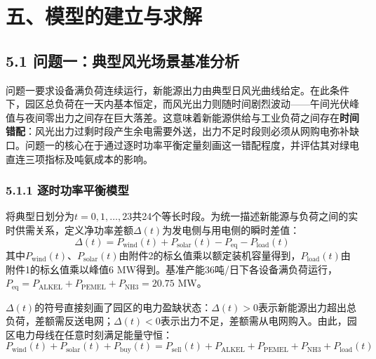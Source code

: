 \documentclass[zihao=-4,a4paper]{ctexart} %
\begin{document}
	\section*{五、模型的建立与求解}
	
	
	\subsection*{5.1 问题一：典型风光场景基准分析}
	
	问题一要求设备满负荷连续运行，新能源出力由典型日风光曲线给定。在此条件下，园区总负荷在一天内基本恒定，而风光出力则随时间剧烈波动——午间光伏峰值与夜间零出力之间存在巨大落差。这意味着新能源供给与工业负荷之间存在\textbf{时间错配}：风光出力过剩时段产生余电需要外送，出力不足时段则必须从网购电弥补缺口。问题一的核心在于通过逐时功率平衡定量刻画这一错配程度，并评估其对绿电直连三项指标及吨氨成本的影响。
	
	\subsubsection*{5.1.1 逐时功率平衡模型}
	将典型日划分为$t=0,1,\dots,23$共24个等长时段。为统一描述新能源与负荷之间的实时供需关系，定义净功率差额$\Delta(t)$为发电侧与用电侧的瞬时差值：
	\begin{equation}
		\Delta(t) = P_{\text{wind}}(t) + P_{\text{solar}}(t) - P_{\text{eq}} - P_{\text{load}}(t)
		\label{eq:delta}
	\end{equation}
	其中$P_{\text{wind}}(t)$、$P_{\text{solar}}(t)$由附件2的标幺值乘以额定装机容量得到，$P_{\text{load}}(t)$由附件1的标幺值乘以峰值6 MW得到。基准产能36吨/日下各设备满负荷运行，$P_{\text{eq}}=P_{\text{ALKEL}}+P_{\text{PEMEL}}+P_{\text{NH3}}=20.75$ MW。
	
	$\Delta(t)$的符号直接刻画了园区的电力盈缺状态：$\Delta(t)>0$表示新能源出力超出总负荷，差额需反送电网；$\Delta(t)<0$表示出力不足，差额需从电网购入。由此，园区电力母线在任意时刻满足能量守恒：
	\begin{equation}
		P_{\text{wind}}(t) + P_{\text{solar}}(t) + P_{\text{buy}}(t) = P_{\text{sell}}(t) + P_{\text{ALKEL}} + P_{\text{PEMEL}} + P_{\text{NH3}} + P_{\text{load}}(t)
		\label{eq:balance}
	\end{equation}
\end{document}
